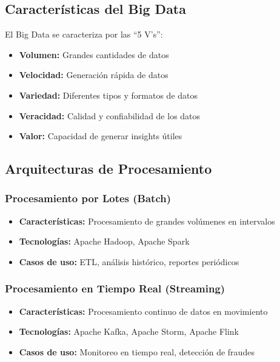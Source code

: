 \subsection{Características del Big Data}

El Big Data se caracteriza por las ``5 V's'':

\begin{itemize}
    \item \textbf{Volumen:} Grandes cantidades de datos
    \item \textbf{Velocidad:} Generación rápida de datos
    \item \textbf{Variedad:} Diferentes tipos y formatos de datos
    \item \textbf{Veracidad:} Calidad y confiabilidad de los datos
    \item \textbf{Valor:} Capacidad de generar insights útiles
\end{itemize}

\subsection{Arquitecturas de Procesamiento}

\subsubsection{Procesamiento por Lotes (Batch)}

\begin{itemize}
    \item \textbf{Características:} Procesamiento de grandes volúmenes en intervalos
    \item \textbf{Tecnologías:} Apache Hadoop, Apache Spark
    \item \textbf{Casos de uso:} ETL, análisis histórico, reportes periódicos
\end{itemize}

\subsubsection{Procesamiento en Tiempo Real (Streaming)}

\begin{itemize}
    \item \textbf{Características:} Procesamiento continuo de datos en movimiento
    \item \textbf{Tecnologías:} Apache Kafka, Apache Storm, Apache Flink
    \item \textbf{Casos de uso:} Monitoreo en tiempo real, detección de fraudes
\end{itemize}

